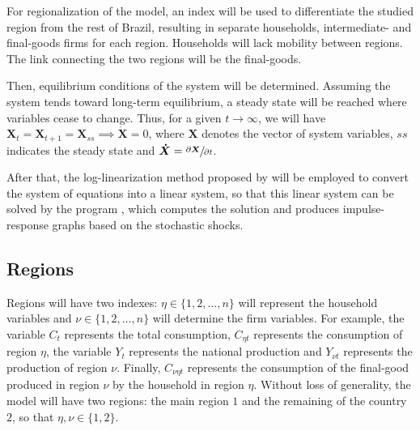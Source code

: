 \documentclass[
thesis.tex
]{subfiles}
\begin{document}
	For regionalization of the model, an index will be used to differentiate the studied region from the rest of Brazil, resulting in separate households, intermediate- and final-goods firms for each region. Households will lack mobility between regions. The link connecting the two regions will be the final-goods.
	
	Then, equilibrium conditions of the system will be determined. Assuming the system tends toward long-term equilibrium, a steady state will be reached where variables cease to change. Thus, for a given $t \longrightarrow \infty$, we will have $\boldsymbol{X}_t = \boldsymbol{X}_{t+1} = \boldsymbol{X}_{ss} \implies \boldsymbol{\dot{X}} = 0$, where $\boldsymbol{X}$ denotes the vector of system variables, $ss$ indicates the steady state and $\boldsymbol{\dot{X}} = \sfrac{\partial \boldsymbol{X}}{\partial t}$. 
	
	After that, the log-linearization method proposed by \textcite{uhlig_toolkit_1999} will be employed to convert the system of equations into a linear system, so that this linear system can be solved by the program \dynare{}, which computes the solution and produces impulse-response graphs based on the stochastic shocks.

	
\subsection*{Regions}\label{sec:regions}

	
	
	Regions will have two indexes: $\eta \in \{1,2,\ldots,n\}$ will represent the household variables and $\nu \in \{1,2,\ldots,n\}$ will determine the firm variables. For example, the variable $C_{t}$ represents the total consumption, $C_{\eta t}$ represents the consumption of region $\eta$, the variable $Y_t$ represents the national production and $Y_{\nu t}$ represents the production of region $\nu$. Finally, $C_{\nu\eta t}$ represents the consumption of the final-good produced in region $\nu$ by the household in region $\eta$. Without loss of generality, the model will have two regions: the main region $1$ and the remaining of the country $2$, so that $\eta,\nu \in \{1,2\}$.
\end{document}
